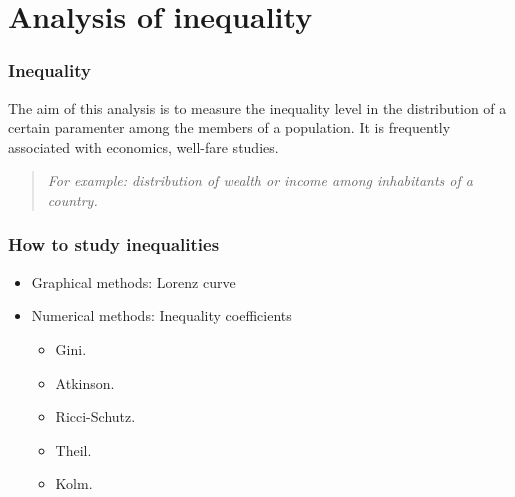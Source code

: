 
\section{Analysis of inequality}


\begin{frame}
\frametitle{Inequality}

The aim of this analysis is to measure the inequality level in the distribution of a certain
paramenter among the members of a population. It is frequently associated with economics,
well-fare studies.\\

\begin{center}
 \begin{quotation}
  \textit{For example: distribution of wealth or income among inhabitants of a country.}
  \end{quotation}
\end{center}

\end{frame}


\begin{frame}
\frametitle{How to study inequalities}

\begin{itemize}
  \item Graphical methods: Lorenz curve
  \item Numerical methods: Inequality coefficients
  \begin{itemize}
   \item Gini.
   \item Atkinson.
   \item Ricci-Schutz.
   \item Theil.
   \item Kolm.
  \end{itemize}

\end{itemize}

\end{frame}

